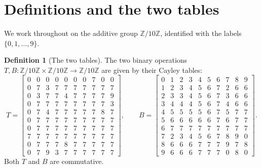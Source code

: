 \documentclass[11pt,reqno]{amsart}
\theoremstyle{plain}
\theoremstyle{definition}
\newtheorem{definition}[theorem]{Definition}
\theoremstyle{remark}
\newcommand{\Z}{\mathbb{Z}}
\newcommand{\Zten}{\Z/10\Z}
\begin{document}
\section{Definitions and the two tables}\label{sec:setup}

We work throughout on the additive group $\Zten$, identified with
the labels $\{0,1,\dots,9\}$.

\begin{definition}[The two tables]\label{def:tables}
The two binary operations $T,B:\Zten\times\Zten\to\Zten$ are given
by their Cayley tables:
\[
T = \left[
\begin{array}{*{10}{c}}
0 & 0 & 0 & 0 & 0 & 0 & 0 & 7 & 0 & 0 \\
0 & 7 & 3 & 7 & 7 & 7 & 7 & 7 & 7 & 7 \\
0 & 3 & 7 & 7 & 4 & 7 & 7 & 7 & 7 & 9 \\
0 & 7 & 7 & 7 & 7 & 7 & 7 & 7 & 7 & 3 \\
0 & 7 & 4 & 7 & 7 & 7 & 7 & 7 & 8 & 7 \\
0 & 7 & 7 & 7 & 7 & 7 & 7 & 7 & 7 & 7 \\
0 & 7 & 7 & 7 & 7 & 7 & 7 & 7 & 7 & 7 \\
7 & 7 & 7 & 7 & 7 & 7 & 7 & 7 & 7 & 7 \\
0 & 7 & 7 & 7 & 8 & 7 & 7 & 7 & 7 & 7 \\
0 & 7 & 9 & 3 & 7 & 7 & 7 & 7 & 7 & 7
\end{array}
\right],\qquad
B = \left[
\begin{array}{*{10}{c}}
0 & 1 & 2 & 3 & 4 & 5 & 6 & 7 & 8 & 9 \\
1 & 2 & 3 & 4 & 5 & 6 & 7 & 2 & 6 & 6 \\
2 & 3 & 3 & 4 & 5 & 6 & 7 & 3 & 6 & 6 \\
3 & 4 & 4 & 4 & 5 & 6 & 7 & 4 & 6 & 6 \\
4 & 5 & 5 & 5 & 5 & 6 & 7 & 5 & 7 & 7 \\
5 & 6 & 6 & 6 & 6 & 6 & 7 & 6 & 7 & 7 \\
6 & 7 & 7 & 7 & 7 & 7 & 7 & 7 & 7 & 7 \\
7 & 2 & 3 & 4 & 5 & 6 & 7 & 8 & 9 & 0 \\
8 & 6 & 6 & 6 & 7 & 7 & 7 & 9 & 7 & 8 \\
9 & 6 & 6 & 6 & 7 & 7 & 7 & 0 & 8 & 0
\end{array}
\right].
\]
Both $T$ and $B$ are commutative.
\end{definition}
\end{document}
